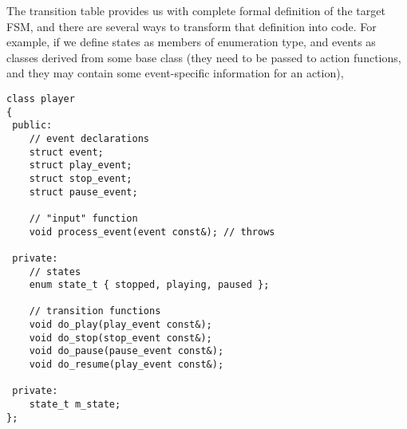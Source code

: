 \documentclass{kapproc}
\begin{document}

The transition table provides us with complete formal 
definition of the target FSM, and there are several ways to 
transform that definition into code. For example, if we define
states as members of enumeration type, and events as classes 
derived from some base 
class (they need to be passed to action functions, and they may
contain some event-specific information for an action), 

{\small
\begin{codesamp}\begin{verbatim}
class player
{
 public:
    // event declarations
    struct event;
    struct play_event;
    struct stop_event;
    struct pause_event;

    // "input" function
    void process_event(event const&); // throws

 private:
    // states
    enum state_t { stopped, playing, paused };

    // transition functions
    void do_play(play_event const&);
    void do_stop(stop_event const&);
    void do_pause(pause_event const&);
    void do_resume(play_event const&);

 private:
    state_t m_state;
};
\end{verbatim}
\end{codesamp}
}

\end{document}
